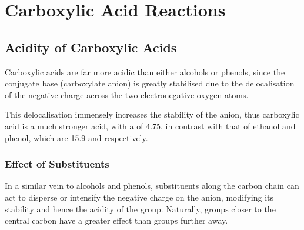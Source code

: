 


	\pagebreak
	\section{Carboxylic Acid Reactions}

		\subsection{Acidity of Carboxylic Acids}

			Carboxylic acids are far more acidic than either alcohols or phenols, since the conjugate base (carboxylate anion) is greatly
			stabilised due to the delocalisation of the negative charge across the two electronegative oxygen atoms.


			This delocalisation immensely increases the stability of the anion, thus carboxylic acid is a much stronger acid, with a \pKa of
			\num{4.75}, in contrast with that of ethanol and phenol, which are \num{15.9} and  respectively.

			\subsubsection{Effect of Substituents}

				In a similar vein to alcohols and phenols, substituents along the carbon chain can act to disperse or intensify the negative
				charge on the anion, modifying its stability and hence the acidity of the group. Naturally, groups closer to the central
				carbon have a greater effect than groups further away.

